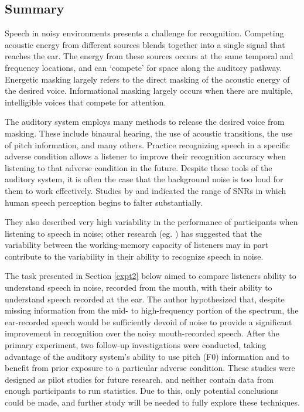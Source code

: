 \subsection{Summary}

Speech in noisy environments presents a challenge for recognition.  Competing acoustic energy from different sources blends together into a single signal that reaches the ear.  The energy from these sources occurs at the same temporal and frequency locations, and can `compete' for space along the auditory pathway.  Energetic masking largely refers to the direct masking of the acoustic energy of the desired voice.  Informational masking largely occurs when there are multiple, intelligible voices that compete for attention.

The auditory system employs many methods to release the desired voice from masking.  These include binaural hearing, the use of acoustic transitions, the use of pitch information, and many others.  Practice recognizing speech in a specific adverse condition allows a listener to improve their recognition accuracy when listening to that adverse condition in the future.  Despite these tools of the auditory system, it is often the case that the background noise is too loud for them to work effectively.  Studies by \cite{ding:13} and \cite{gilbert:13} indicated the range of SNRs in which human speech perception begins to falter substantially.

They also described very high variability in the performance of \DIFdelbegin {}\DIFdelend participants when listening to speech in noise; other research (eg. \cite{tamati:13}) has suggested that the variability between the working-memory capacity of listeners may in part contribute to the variability in their ability to recognize speech in noise.

The task presented in Section \ref{expt2} below aimed to compare listeners ability to understand speech in noise, recorded from the mouth, with their ability to understand speech recorded at the ear.  The author hypothesized that, despite missing information from the mid- to high-frequency portion of the spectrum, the ear-recorded speech would be sufficiently devoid of noise to provide a significant improvement in recognition over the noisy mouth-recorded speech.  After the primary experiment, two follow-up investigations were conducted, taking advantage of the auditory system's ability to use pitch (F0) information and to benefit from prior exposure to a particular adverse condition.  These studies were designed as pilot studies for future research, and neither contain data from enough participants to run statistics.  Due to this, only potential conclusions could be made, and further study will be needed to fully explore these techniques. 


